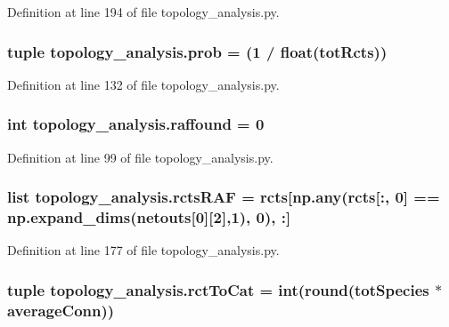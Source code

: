 Definition at line 194 of file topology\-\_\-analysis.\-py.

\hypertarget{a00157_aad2c05e3d2146196ed236911dd796f6e}{
\subsubsection[{prob}]{\setlength{\rightskip}{0pt plus 5cm}tuple topology\-\_\-analysis.\-prob = (1 / float({\bf tot\-Rcts}))}}\label{a00157_aad2c05e3d2146196ed236911dd796f6e}


Definition at line 132 of file topology\-\_\-analysis.\-py.

\hypertarget{a00157_ad625a009a3da81a04b490e62975ecf39}{
\subsubsection[{raffound}]{\setlength{\rightskip}{0pt plus 5cm}int topology\-\_\-analysis.\-raffound = 0}}\label{a00157_ad625a009a3da81a04b490e62975ecf39}


Definition at line 99 of file topology\-\_\-analysis.\-py.

\hypertarget{a00157_aeb909c76682b690cc5ab6aca5ac37c4d}{
\subsubsection[{rcts\-R\-A\-F}]{\setlength{\rightskip}{0pt plus 5cm}list topology\-\_\-analysis.\-rcts\-R\-A\-F = rcts\mbox{[}np.\-any(rcts\mbox{[}\-:, 0\mbox{]} == np.\-expand\-\_\-dims({\bf netouts}\mbox{[}0\mbox{]}\mbox{[}2\mbox{]},1), 0), \-:\mbox{]}}}\label{a00157_aeb909c76682b690cc5ab6aca5ac37c4d}


Definition at line 177 of file topology\-\_\-analysis.\-py.

\hypertarget{a00157_afa804d4b1d39a63de9f14e5ab379ae34}{
\subsubsection[{rct\-To\-Cat}]{\setlength{\rightskip}{0pt plus 5cm}tuple topology\-\_\-analysis.\-rct\-To\-Cat = int(round({\bf tot\-Species} $\ast$ {\bf average\-Conn}))}}\label{a00157_afa804d4b1d39a63de9f14e5ab379ae34}


